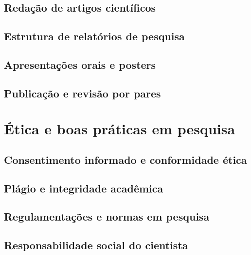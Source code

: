 \documentclass[
]{book}
\begin{document}
\section{Redação de artigos científicos}\label{redauxe7uxe3o-de-artigos-cientuxedficos}

\section{Estrutura de relatórios de pesquisa}\label{estrutura-de-relatuxf3rios-de-pesquisa}

\section{Apresentações orais e posters}\label{apresentauxe7uxf5es-orais-e-posters}

\section{Publicação e revisão por pares}\label{publicauxe7uxe3o-e-revisuxe3o-por-pares}

\chapter{Ética e boas práticas em pesquisa}\label{uxe9tica-e-boas-pruxe1ticas-em-pesquisa}

\section{Consentimento informado e conformidade ética}\label{consentimento-informado-e-conformidade-uxe9tica}

\section{Plágio e integridade acadêmica}\label{pluxe1gio-e-integridade-acaduxeamica}

\section{Regulamentações e normas em pesquisa}\label{regulamentauxe7uxf5es-e-normas-em-pesquisa}

\section{Responsabilidade social do cientista}\label{responsabilidade-social-do-cientista}
\end{document}
